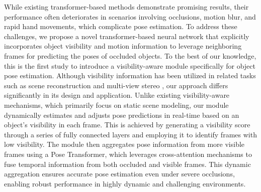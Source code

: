 While existing transformer-based methods demonstrate promising results, their performance often deteriorates in scenarios involving occlusions, motion blur, and rapid hand movements, which complicate pose estimation. To address these challenges, we propose a novel transformer-based neural network that explicitly incorporates object visibility and motion information to leverage neighboring frames for predicting the poses of occluded objects. To the best of our knowledge, this is the first study to introduce a visibility-aware module specifically for object pose estimation. Although visibility information has been utilized in related tasks such as scene reconstruction \cite{gao2023visfusion} and multi-view stereo \cite{huang2025visibility, chen2020visibility}, our approach differs significantly in its design and application. Unlike existing visibility-aware mechanisms, which primarily focus on static scene modeling, our module dynamically estimates and adjusts pose predictions in real-time based on an object's visibility in each frame. This is achieved by generating a visibility score through a series of fully connected layers and employing it to identify frames with low visibility. The module then aggregates pose information from more visible frames using a Pose Transformer, which leverages cross-attention mechanisms to fuse temporal information from both occluded and visible frames. This dynamic aggregation ensures accurate pose estimation even under severe occlusions, enabling robust performance in highly dynamic and challenging environments.
